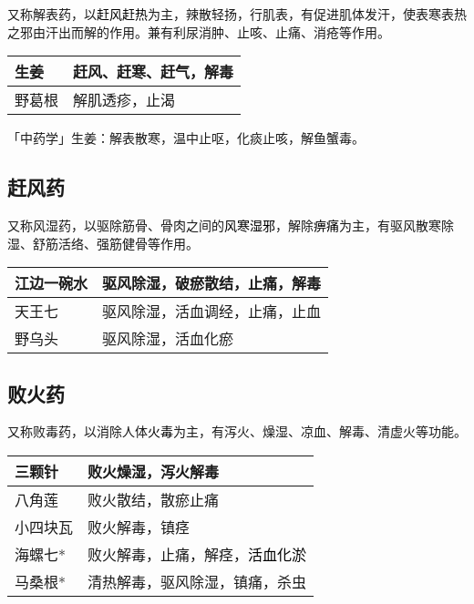 \documentclass[cn,hazy,black,12pt,normal,founder]{elegantnote}
\newcommand{\redt}[1]{\textcolor{black}{{}#1}}      %
\begin{document}
又称解表药，以\redt{赶风赶热}为主，辣散轻扬，行肌表，有促进肌体发汗，使表寒表热之邪由汗出而解的作用。兼有利尿消肿、止咳、止痛、消疮等作用。

\begin{table}[H]
  \begin{tabular}{|l|l|}
  \hline
  生姜 & 赶风、赶寒、赶气，解毒 \\ \hline
  野葛根 & 解肌透疹，止渴     \\ \hline
  \end{tabular}
\end{table}

\begin{note}
  「中药学」生姜：解表散寒，温中止呕，化痰止咳，解鱼蟹毒。
\end{note}

\subsection{赶风药}

又称风湿药，以驱除筋骨、骨肉之间的\redt{风寒湿邪}，解除\redt{痹痛}为主，有驱风散寒除湿、舒筋活络、强筋健骨等作用。

\begin{table}[H]
  \begin{tabular}{|l|l|}
  \hline
  江边一碗水  & 驱风除湿，破瘀散结，止痛，解毒 \\ \hline
  天王七     & 驱风除湿，活血调经，止痛，止血     \\ \hline
  野乌头     & 驱风除湿，活血化瘀               \\ \hline
  \end{tabular}
\end{table}

\subsection{败火药}

又称败毒药，以消除人体\redt{火毒}为主，有泻火、燥湿、凉血、解毒、清虚火等功能。

\begin{table}[H]
  \begin{tabular}{|l|l|}
  \hline
  三颗针    & 败火燥湿，泻火解毒     \\ \hline
  八角莲    & 败火散结，散瘀止痛     \\ \hline
  小四块瓦  & 败火解毒，镇痉         \\ \hline
  海螺七*    & 败火解毒，止痛，解痉，\redt{活血化淤}    \\ \hline
  马桑根*    & 清热解毒，驱风除湿，镇痛，杀虫   \\ \hline
  \end{tabular}
\end{table}
\end{document}
